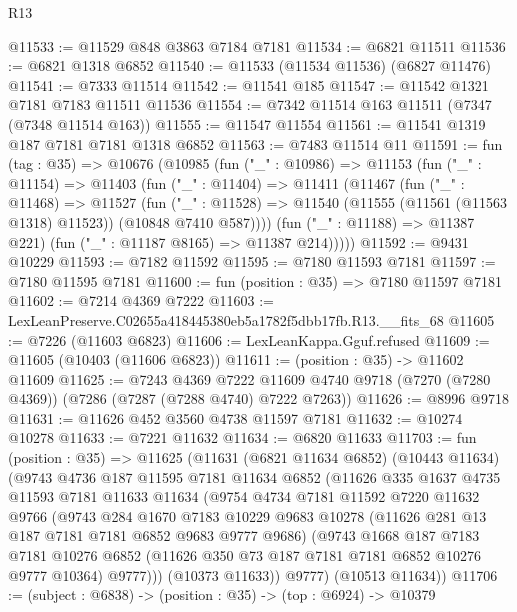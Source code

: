 \begin{lexlean}{R13}
\begin{coremodule}
@11533 := @11529 @848 @3863 @7184 @7181
@11534 := @6821 @11511
@11536 := @6821 @1318 @6852
@11540 := @11533 (@11534 @11536) (@6827 @11476)
@11541 := @7333 @11514
@11542 := @11541 @185
@11547 := @11542 @1321 @7181 @7183 @11511 @11536
@11554 := @7342 @11514 @163 @11511 (@7347 (@7348 @11514 @163))
@11555 := @11547 @11554
@11561 := @11541 @1319 @187 @7181 @7181 @1318 @6852
@11563 := @7483 @11514 @11
@11591 := fun (tag : @35) =>
  @10676
    (@10985
      (fun ("_" : @10986) =>
      @11153
        (fun ("_" : @11154) =>
        @11403
          (fun ("_" : @11404) =>
          @11411
            (@11467
              (fun ("_" : @11468) =>
              @11527
                (fun ("_" : @11528) =>
                @11540 (@11555 (@11561 (@11563 @1318) @11523)) (@10848 @7410 @587))))
            (fun ("_" : @11188) => @11387 @221)
            (fun ("_" : @11187 @8165) => @11387 @214)))))
@11592 := @9431 @10229
@11593 := @7182 @11592
@11595 := @7180 @11593 @7181
@11597 := @7180 @11595 @7181
@11600 := fun (position : @35) => @7180 @11597 @7181
@11602 := @7214 @4369 @7222
@11603 := LexLeanPreserve.C02655a418445380eb5a1782f5dbb17fb.R13.__fits_68
@11605 := @7226 (@11603 @6823)
@11606 := LexLeanKappa.Gguf.refused
@11609 := @11605 (@10403 (@11606 @6823))
@11611 := (position : @35) -> @11602 @11609
@11625 := @7243
    @4369
    @7222
    @11609
    @4740
    @9718
    (@7270 (@7280 @4369))
    (@7286 (@7287 (@7288 @4740) @7222 @7263))
@11626 := @8996 @9718
@11631 := @11626 @452 @3560 @4738 @11597 @7181
@11632 := @10274 @10278
@11633 := @7221 @11632
@11634 := @6820 @11633
@11703 := fun (position : @35) =>
  @11625
    (@11631
      (@6821 @11634 @6852)
      (@10443 @11634)
      (@9743
        @4736
        @187
        @11595
        @7181
        @11634
        @6852
        (@11626
          @335
          @1637
          @4735
          @11593
          @7181
          @11633
          @11634
          (@9754
            @4734
            @7181
            @11592
            @7220
            @11632
            @9766
            (@9743
              @284
              @1670
              @7183
              @10229
              @9683
              @10278
              (@11626 @281 @13 @187 @7181 @7181 @6852 @9683 @9777 @9686)
              (@9743
                @1668
                @187
                @7183
                @7181
                @10276
                @6852
                (@11626 @350 @73 @187 @7181 @7181 @6852 @10276 @9777 @10364)
                @9777)))
          (@10373 @11633))
        @9777)
      (@10513 @11634))
@11706 := (subject : @6838) -> (position : @35) -> (top : @6924) -> @10379

\end{coremodule}
\end{lexlean}
